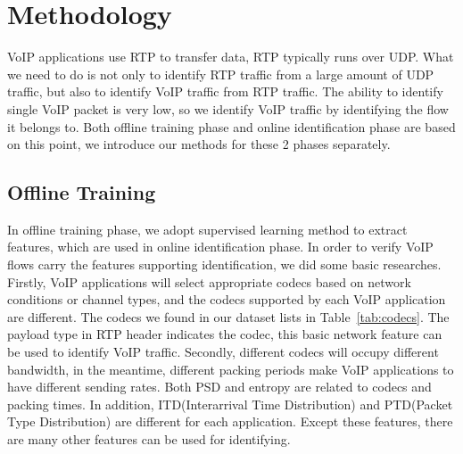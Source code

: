 \documentclass[conference]{IEEEtran}
\begin{document}

\section{Methodology}
\label{sec:methodology}

VoIP applications use RTP to transfer data, RTP typically runs over UDP. What we need to do is not only to identify RTP traffic from a large amount of UDP traffic, but also to identify VoIP traffic from RTP traffic. The ability to identify single VoIP packet is very low, so we identify VoIP traffic by identifying the flow it belongs to. Both offline training phase and online identification phase are based on this point, we introduce our methods for these 2 phases separately.

\subsection{Offline Training}
\label{sec:offlinetraining}
In offline training phase, we adopt supervised learning method to extract features, which are used in online identification phase. In order to verify VoIP flows carry the features supporting identification, we did some basic researches. Firstly, VoIP applications will select appropriate codecs based on network conditions or channel types, and the codecs supported by each VoIP application are different. The codecs we found in our dataset lists in Table~\ref{tab:codecs}. The payload type in RTP header indicates the codec, this basic network feature can be used to identify VoIP traffic. Secondly, different codecs will occupy different bandwidth, in the meantime, different packing periods make VoIP applications to have different sending rates. Both PSD \cite{22} and entropy \cite{4} are related to codecs and packing times. In addition, ITD(Interarrival Time Distribution) and PTD(Packet Type Distribution) are different for each application. Except these features, there are many other features can be used for identifying.
\end{document}
